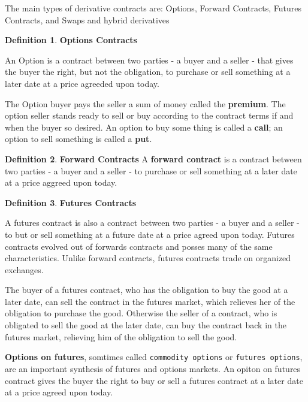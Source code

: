 \documentclass{book}
\theoremstyle{definition}
\newtheorem{definition}{Definition}[section]
\theoremstyle{remark}
\begin{document}
        The main types of derivative contracts are: Options, Forward Contracts, Futures Contracts, and Swaps and hybrid derivatives
        
        \begin{definition} {\textbf{Options Contracts}}
            
            An Option is a contract between two parties - a buyer and a seller - that gives the buyer the right, but not the obligation, to purchase or sell something at a later date at a price agreeded upon today. 
            
            The Option buyer pays the seller a sum of money called the \textbf{premium}. The option seller stands ready to sell or buy according to the contract terms if and when the buyer so desired. An option to buy some thing is called a \textbf{call}; an option to sell something is called a \textbf{put}.
            \end{definition}
            
            \begin{definition}{\textbf{Forward Contracts}}
            A \textbf{forward contract} is a contract between two parties - a buyer and a seller - to purchase or sell something at a later date at a price aggreed upon today.
        \end{definition}
        
        \begin{definition} {\textbf{Futures Contracts}}
            
            A futures contract is also a contract between two parties - a buyer and a seller - to but or sell something at a future date at a price agreed upon today. Futures contracts evolved out of forwards contracts and posses many of the same characteristics. Unlike forward contracts, futures contracts trade on organized exchanges.  
            
            The buyer of a futures contract, who has the obligation to buy the good at a later date, can sell the contract in the futures market, which relieves her of the obligation to purchase the good. Otherwise the seller of a contract, who is obligated to sell the good at the later date, can buy the contract back in the futures market, relieving him of the obligation to sell the good.  
            
            
            \textbf{Options on futures}, somtimes called \texttt{commodity options} or \texttt{futures options}, are an important synthesis of futures and options markets. An opiton on futures contract gives the buyer the right to buy or sell a futures contract at a later date at a price agreed upon today. 
        \end{definition}
        
\end{document}
